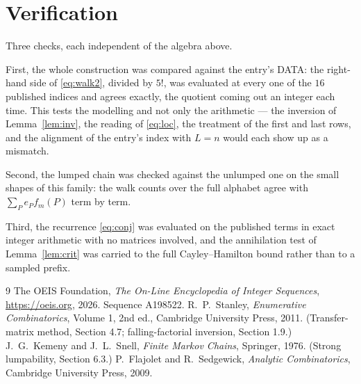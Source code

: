 \documentclass[11pt,a4paper]{article}
\theoremstyle{plain}
\theoremstyle{definition}
\begin{document}
\section{Verification}

Three checks, each independent of the algebra above.

First, the whole construction was compared against the entry's DATA: the right-hand side of
\eqref{eq:walk2}, divided by $5!$, was evaluated at every one of the $16$
published indices and agrees exactly, the quotient coming out an integer each time. This
tests the modelling and not only the arithmetic --- the inversion of Lemma~\ref{lem:inv},
the reading of \eqref{eq:loc}, the treatment of the first and last rows, and the
alignment of the entry's index with $L=n$ would each show up as a mismatch.

Second, the lumped chain was checked against the unlumped one on the small shapes of this
family: the walk counts over the full alphabet agree with $\sum_P e_Pf_m(P)$ term by term.

Third, the recurrence \eqref{eq:conj} was evaluated on the published terms in exact integer
arithmetic with no matrices involved, and the annihilation test of Lemma~\ref{lem:crit} was
carried to the full Cayley--Hamilton bound rather than to a sampled prefix.

\begin{thebibliography}{9}
 The OEIS Foundation, \emph{The On-Line Encyclopedia of Integer
Sequences}, \url{https://oeis.org}, 2026. Sequence A198522.
 R.~P.~Stanley, \emph{Enumerative Combinatorics}, Volume 1, 2nd ed.,
Cambridge University Press, 2011. (Transfer-matrix method, Section 4.7; falling-factorial
inversion, Section 1.9.)
 J.~G.~Kemeny and J.~L.~Snell, \emph{Finite Markov Chains}, Springer,
1976. (Strong lumpability, Section 6.3.)
 P.~Flajolet and R.~Sedgewick, \emph{Analytic Combinatorics}, Cambridge
University Press, 2009.
\end{thebibliography}
\end{document}
